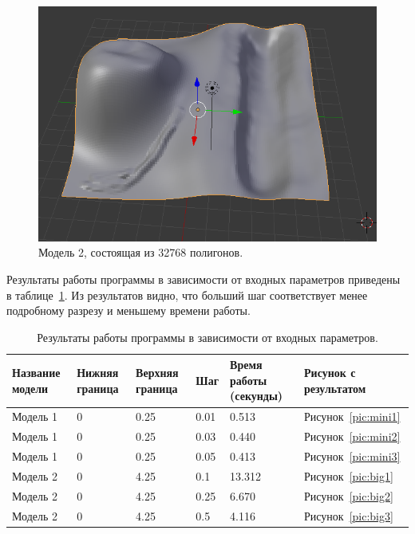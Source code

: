 \documentclass[12pt,a4paper,oneside]{extarticle}
\begin{document}
    \begin{figure}[h!]
            \center
            \includegraphics[scale=0.5]{big.png}
            \caption{Модель 2, состоящая из 32768 полигонов.}
            \label{pic:big}
    \end{figure}
    
    Результаты работы программы в зависимости от входных параметров приведены в таблице~\ref{tabular:results}. Из результатов видно, что больший шаг соответствует менее подробному разрезу и меньшему времени работы.

    \begin{table}[ht!]
                  
        \caption{Результаты работы программы в зависимости от входных параметров. \bigskip}
        \centering             
        
        \label{tabular:results}  
        \begin{sideways}
        \begin{tabular}{|l|l|l|l|l|l|}
            \hline
            \textbf{Название модели} & \textbf{Нижняя граница} & \textbf{Верхняя граница} & \textbf{Шаг} & \textbf{Время работы (секунды)} & \textbf{Рисунок с результатом}
            \\ \hline
            Модель 1 & 0 & 0.25 & 0.01 & 0.513 & Рисунок~\ref{pic:mini1}
            \\ \hline
            Модель 1 & 0 & 0.25 & 0.03 & 0.440 & Рисунок~\ref{pic:mini2}
            \\ \hline
            Модель 1 & 0 & 0.25 & 0.05 & 0.413 & Рисунок~\ref{pic:mini3}
            \\ \hline

            Модель 2 & 0 & 4.25 & 0.1 & 13.312 & Рисунок~\ref{pic:big1}
            \\ \hline
            Модель 2 & 0 & 4.25 & 0.25 & 6.670 & Рисунок~\ref{pic:big2}
            \\ \hline
            Модель 2 & 0 & 4.25 & 0.5 & 4.116 & Рисунок~\ref{pic:big3}
            \\ \hline
        \end{tabular}   
        \end{sideways}     

    \end{table}
\end{document}
